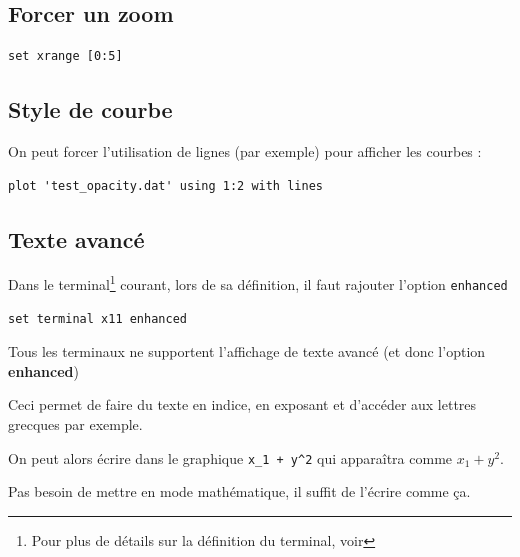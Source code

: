 \documentclass[a4paper,twoside]{article}
\begin{document}
\subsection{Forcer un zoom}
\begin{verbatim}
set xrange [0:5]
\end{verbatim}

\subsection{Style de courbe}
On peut forcer l'utilisation de lignes (par exemple) pour afficher les courbes : 
\begin{verbatim}
plot 'test_opacity.dat' using 1:2 with lines
\end{verbatim}


\subsection{Texte avancé}
Dans le terminal\footnote{Pour plus de détails sur la définition du terminal, voir } courant, lors de sa définition, il faut rajouter l'option \texttt{enhanced}

\begin{verbatim}
set terminal x11 enhanced
\end{verbatim}

\begin{attention}
Tous les terminaux ne supportent l'affichage de texte avancé (et donc l'option \textbf{enhanced})
\end{attention}


Ceci permet de faire du texte en indice, en exposant et d'accéder aux lettres grecques par exemple. 

On peut alors écrire dans le graphique \verb|x_1 + y^2| qui apparaîtra comme $x_1 + y^2$.

\begin{remarque}
Pas besoin de mettre en mode mathématique, il suffit de l'écrire comme ça.
\end{remarque}


\bigskip
\end{document}
